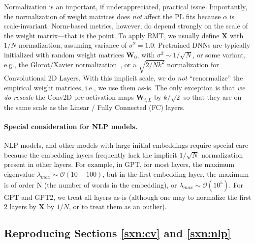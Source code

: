 Normalization is an important, if underappreciated, practical issue.
Importantly, the normalization of weight matrices does \emph{not} affect the PL fits because $\alpha$ is scale-invariant.
Norm-based metrics, however, do depend strongly on the scale of the weight matrix---that is the point.
To apply RMT, we usually define $\mathbf{X}$ with $1/N$ normalization, assuming variance of $\sigma^{2}=1.0$.
Pretrained DNNs are typically initialized with random weight matrices $\mathbf{W}_{0}$, with
 $\sigma^{2}\sim 1/\sqrt{N}$, or some variant, e.g., the Glorot/Xavier normalization~\cite{GloBen10}, or a $\sqrt{2/Nk^2}$ normalization for Convolutional 2D Layers. With this implicit scale, 
we do \emph{not} ``renormalize'' the empirical weight matrices, i.e., we use them as-is.
The only exception is that \emph{we do rescale} the Conv2D pre-activation maps $\mathbf{W}_{i,L}$ 
by $k/\sqrt{2}$ so that they are on the same scale as the Linear / Fully Connected (FC) layers.


\paragraph{Special consideration for NLP models.}

NLP models, and other models with large initial embeddings require special care because the
embedding layers frequently lack the implicit $1/\sqrt{N}$ normalization present in other layers.
For example, in GPT, for most layers, the maximum eigenvalue $\lambda_{max}\sim\mathcal{O}(10-100)$,
but in the first embedding layer, the maximum is of order N (the number of words in the embedding), or
 $\lambda_{max}\sim\mathcal{O}(10^{5})$.  For GPT and GPT2, we treat all layers as-is (although one may to normalize
the first 2 layers by  $\mathbf{X}$ by $1/N$, or to treat them as an outlier).


\subsection{Reproducing Sections \ref{sxn:cv} and \ref{sxn:nlp} }   %

